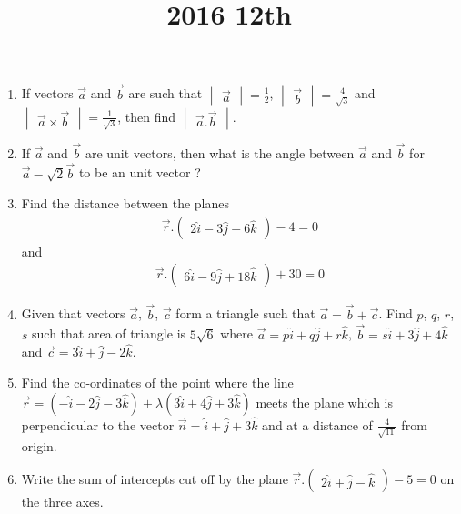 \documentclass[12pt,-letter paper]{article}
\title{2016 12th}
\newcommand{\myvec}[1]{\ensuremath{\begin{pmatrix}#1\end{pmatrix}}}
\newcommand{\mydet}[1]{\ensuremath{\begin{vmatrix}#1\end{vmatrix}}}
\begin{document}

\begin{enumerate}

\section{Vectors}
	\item If vectors $\overrightarrow{a}$ and $\overrightarrow{b}$ are such that
 $\mydet{\overrightarrow{a}} = \frac{1}{2}$, $\mydet{\overrightarrow{b}} = \frac{4}{\sqrt{3}}$
 and $\mydet{\overrightarrow{a} \times \overrightarrow{b}} = \frac{1}{\sqrt{3}}$, then find 
 $\mydet{\overrightarrow{a}.\overrightarrow{b}}$.

	\item If $\overrightarrow{a}$ and $\overrightarrow{b}$ are unit vectors, then what is the angle between 
$\overrightarrow{a}$ and $\overrightarrow{b}$ for $\overrightarrow{a} - \sqrt{2}\overrightarrow{b}$ to be an unit vector ?
	
	\item Find the distance between the planes 
		\begin{align*}
			\overrightarrow{r}.\myvec{2\hat{i}-3\hat{j}+6\hat{k} } - 4 =0
		\end{align*}
	and 
		\begin{align*}
			\overrightarrow{r}.\myvec{6\hat{i}-9\hat{j} +18\hat{k}} +30 =0
		\end{align*}

	\item Given that vectors $\overrightarrow{a}$, $\overrightarrow{b}$, $\overrightarrow{c}$ form a triangle such that 
$\overrightarrow{a} = \overrightarrow{b}+\overrightarrow{c}$. Find $p$, $q$, $r$, $s$ such that area of triangle is $5\sqrt{6}$ where $\overrightarrow{a} = p\hat{i} +q\hat{j}+r\hat{k}$, 
$\overrightarrow{b} = s\hat{i} +3\hat{j}+4\hat{k}$ and $\overrightarrow{c}=3\hat{i} +\hat{j}-2\hat{k}$.
	
	\item Find the co-ordinates of the point where the line $\overrightarrow{r}=(-\hat{i}-2\hat{j}-3\hat{k})+\lambda(3\hat{i} +4\hat{j}+3\hat{k})$ meets the plane which is perpendicular to the vector $\overrightarrow{n}=\hat{i}+\hat{j} +3\hat{k}$ and at a distance of
$\frac{4}{\sqrt{11}}$ from origin.

	
	\item Write the sum of intercepts cut off by the plane $\overrightarrow{r}.\myvec{2\hat{i}+\hat{j}-\hat{k}} - 5 = 0$ on the three axes.


\end{enumerate}
\end{document}
